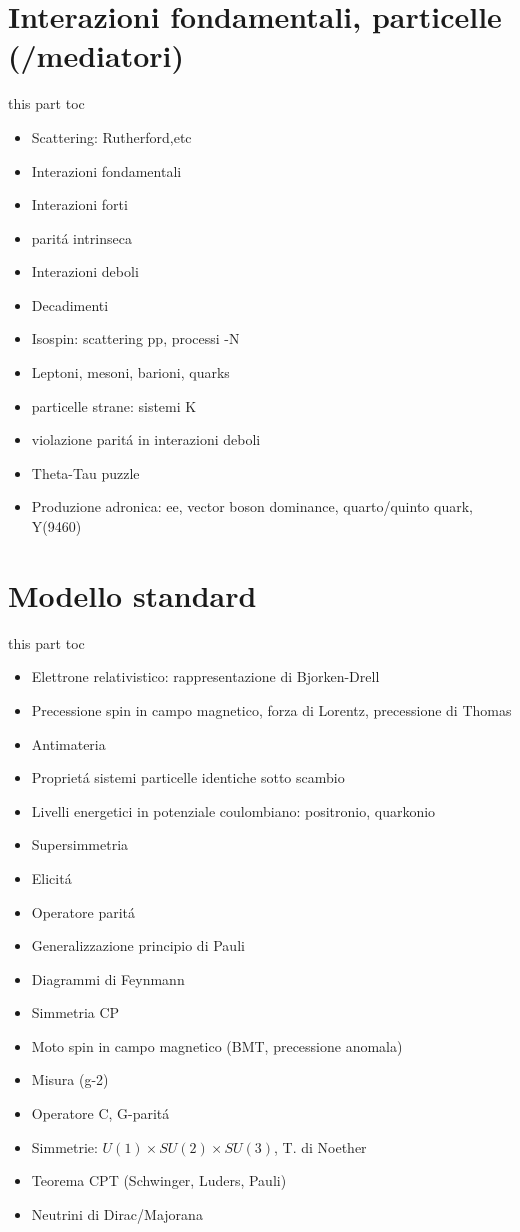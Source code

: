 \documentclass[10pt,xcolor={usenames},fleqn,mathserif,serif]{beamer}
\begin{document}
\part{Interazioni fondamentali, particelle (/mediatori)}\label{tools}
\frame{\partpage}
\begin{frame}{this part toc}
\begin{itemize}
\item Scattering: Rutherford,etc
\item Interazioni fondamentali
\item Interazioni forti
\item parit\'a intrinseca \Ppi
\item Interazioni deboli
\item Decadimenti
\item Isospin: scattering pp, processi \Ppi-N
\item Leptoni, mesoni, barioni, quarks
\item particelle strane: sistemi K
\item violazione parit\'a in interazioni deboli
\item Theta-Tau puzzle
\item Produzione adronica: ee, vector boson dominance, quarto/quinto quark, Y(9460)
\end{itemize}
\end{frame}


\part{Modello standard}
\frame{\partpage}
\begin{frame}{this part toc}
\begin{itemize}
\item Elettrone relativistico: rappresentazione di Bjorken-Drell
\item Precessione spin in campo magnetico, forza di Lorentz, precessione di Thomas
\item Antimateria
\item Propriet\'a sistemi particelle identiche sotto scambio
\item Livelli energetici in potenziale coulombiano: positronio, quarkonio
\item Supersimmetria
\item Elicit\'a
\item Operatore parit\'a
\item Generalizzazione principio di Pauli
\item Diagrammi di Feynmann
\item Simmetria CP
\item Moto spin in campo magnetico (BMT, precessione anomala)
\item Misura (g-2)
\item Operatore C, G-parit\'a
\item Simmetrie: $U(1)\times SU(2)\times SU(3)$, T. di Noether
\item Teorema CPT (Schwinger, Luders, Pauli)
\item Neutrini di Dirac/Majorana
\end{itemize}
\end{frame}

\end{document}
